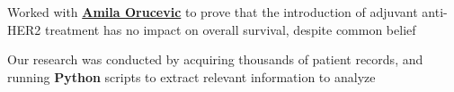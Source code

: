 \documentclass[letterpaper]{deedy-resume} %
\begin{document}
\begin{minipage}[t]{0.66\textwidth}


  \begin{tightitemize}
  \item Worked with \textbf{\href{http://gsm.utmck.edu/pathology/faculty/orucevic.cfm}{Amila Orucevic}} to prove that the introduction of adjuvant anti-HER2 treatment has no impact on overall survival, despite common belief
  \item Our research was conducted by acquiring thousands of patient records, and running \textbf{Python} scripts to extract relevant information to analyze
  \end{tightitemize}

  \sectionspace %

\end{minipage} %
\end{document}
